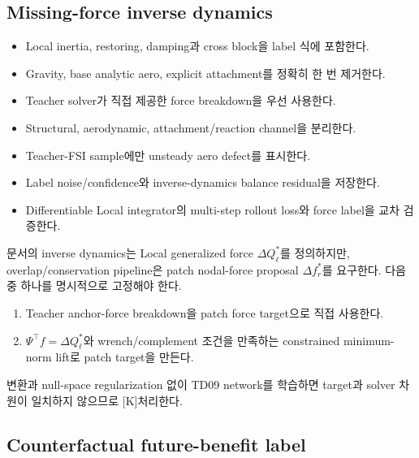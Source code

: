 \documentclass[10pt,a4paper]{article}
\newcommand{\todo}{\textcolor{TodoGray}{\(\square\)}}
\newcommand{\killmark}{\textcolor{KillRed}{[K]}}
\begin{document}
\subsection*{Missing-force inverse dynamics}

\begin{itemize}
  \item[\todo] Local inertia, restoring, damping과 cross block을 label 식에 포함한다.
  \item[\todo] Gravity, base analytic aero, explicit attachment를 정확히 한 번 제거한다.
  \item[\todo] Teacher solver가 직접 제공한 force breakdown을 우선 사용한다.
  \item[\todo] Structural, aerodynamic, attachment/reaction channel을 분리한다.
  \item[\todo] Teacher-FSI sample에만 unsteady aero defect를 표시한다.
  \item[\todo] Label noise/confidence와 inverse-dynamics balance residual을 저장한다.
  \item[\todo] Differentiable Local integrator의 multi-step rollout loss와 force label을 교차 검증한다.
\end{itemize}

\begin{tcolorbox}[colback=LightRed,colframe=BlockRed,title=TD09 전에 반드시 해결할 차원 결정,fonttitle=\bfseries]
문서의 inverse dynamics는 Local generalized force \(\Delta Q_\ell^*\)를 정의하지만,
overlap/conservation pipeline은 patch nodal-force proposal \(\Delta f_r^*\)를 요구한다.
다음 중 하나를 명시적으로 고정해야 한다.
\begin{enumerate}
  \item Teacher anchor-force breakdown을 patch force target으로 직접 사용한다.
  \item \(\Psi^\top f=\Delta Q_\ell^*\)와 wrench/complement 조건을 만족하는 constrained minimum-norm lift로 patch target을 만든다.
\end{enumerate}
변환과 null-space regularization 없이 TD09 network를 학습하면 target과 solver 차원이 일치하지 않으므로 \killmark 처리한다.
\end{tcolorbox}

\subsection*{Counterfactual future-benefit label}
\end{document}
